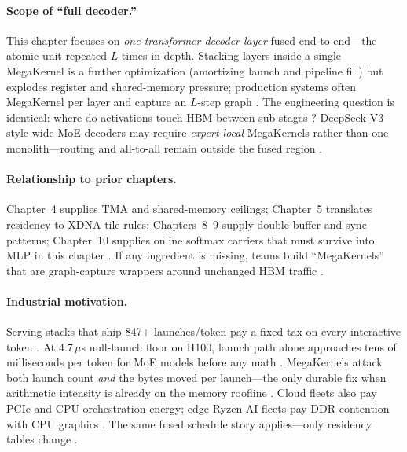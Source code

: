\paragraph{Scope of ``full decoder.''} This chapter focuses on \emph{one transformer decoder layer} fused end-to-end---the atomic unit repeated $L$ times in depth. Stacking layers inside a single MegaKernel is a further optimization (amortizing launch and pipeline fill) but explodes register and shared-memory pressure; production systems often MegaKernel per layer and capture an $L$-step graph \citep{nvidia2024cudagraphs,taxbreak2026}. The engineering question is identical: where do activations touch HBM between sub-stages \citep{memoryfloor2026,patel2025llminference}? DeepSeek-V3-style wide MoE decoders may require \emph{expert-local} MegaKernels rather than one monolith---routing and all-to-all remain outside the fused region \citep{liu2024deepseekv3,taxbreak2026}.

\paragraph{Relationship to prior chapters.} Chapter~4 supplies TMA and shared-memory ceilings; Chapter~5 translates residency to XDNA tile rules; Chapters~8--9 supply double-buffer and sync patterns; Chapter~10 supplies online softmax carriers that must survive into MLP in this chapter \citep{semianalysis2024tma,amd2024aie,dao2022flashattention}. If any ingredient is missing, teams build ``MegaKernels'' that are graph-capture wrappers around unchanged HBM traffic \citep{memoryfloor2026}.

\paragraph{Industrial motivation.} Serving stacks that ship 847+ launches/token pay a fixed tax on every interactive token \citep{taxbreak2026}. At 4.7\,$\mu$s null-launch floor on H100, launch path alone approaches tens of milliseconds per token for MoE models before any math \citep{taxbreak2026,memoryfloor2026}. MegaKernels attack both launch count \emph{and} the bytes moved per launch---the only durable fix when arithmetic intensity is already on the memory roofline \citep{dlbook,patel2025llminference}. Cloud fleets also pay PCIe and CPU orchestration energy; edge Ryzen AI fleets pay DDR contention with CPU graphics \citep{amd2024xdna,amd2024aie}. The same fused schedule story applies---only residency tables change \citep{yirage2026,chen2020compilerbasedhardw}.

